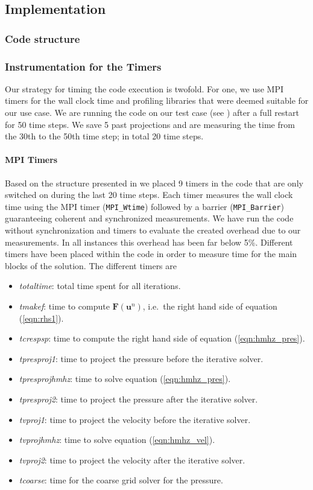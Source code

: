 \documentclass{sig-alternate}
\begin{document}

\subsection{Implementation}
\label{sec:implementation}
\subsubsection{Code structure}
\label{sec:code}

\subsubsection{Instrumentation for the Timers}
\label{sec:timers}
Our strategy for timing the code execution is twofold. For one, we use MPI
timers for the wall clock time and profiling libraries that were deemed suitable
for our use case. We are running the code on our test case (see
) after a full restart for 50 time steps. We save 5 past
projections and are measuring the time from the 30th to the 50th time step; in
total 20 time steps. 
\paragraph{MPI Timers}
Based on the
structure presented in  we placed 9 timers in the code that are
only switched on during the last 20 time steps. Each timer measures the wall
clock time using the MPI timer ({\tt MPI\_Wtime}) followed by a barrier
({\tt MPI\_Barrier}) guaranteeing coherent and synchronized measurements. We
have run the code without synchronization and timers to evaluate the created
overhead due to our measurements. In all instances this overhead has been far
below 5\%. 
Different timers have been placed within the code in order to measure time for the main blocks of the solution. The different timers are
\begin{itemize}
 \item \textit{totaltime}: total time spent for all iterations.
 \item \textit{tmakef}: time to compute $\mathbf{F} \left( \mathbf{u}^{n} \right)$, i.e.\ the right hand side of equation (\ref{eqn:rhs1}).
 \item \textit{tcrespsp}: time to compute the right hand side of equation (\ref{eqn:hmhz_pres}).
 \item \textit{tpresproj1}: time to project the pressure before the iterative solver.
 \item \textit{tpresprojhmhz}: time to solve equation (\ref{eqn:hmhz_pres}).
 \item \textit{tpresproj2}: time to project the pressure after the iterative solver.
 \item \textit{tvproj1}: time to project the velocity before the iterative solver.
 \item \textit{tvprojhmhz}: time to solve equation (\ref{eqn:hmhz_vel}).
 \item \textit{tvproj2}: time to project the velocity after the iterative solver.
 \item \textit{tcoarse}: time for the coarse grid solver for the pressure.
\end{itemize}
\end{document}
